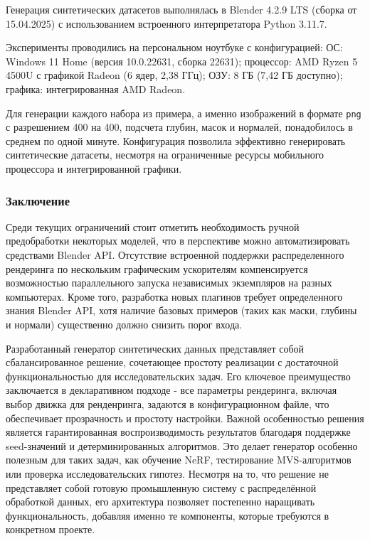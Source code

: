 Генерация синтетических датасетов выполнялась в Blender 4.2.9 LTS (сборка от
15.04.2025) с использованием встроенного интерпретатора Python 3.11.7.

Эксперименты проводились на персональном ноутбуке с конфигурацией: ОС: Windows
11 Home (версия 10.0.22631, сборка 22631); процессор: AMD Ryzen 5 4500U с
графикой Radeon (6 ядер, 2,38 ГГц); ОЗУ: 8 ГБ (7,42 ГБ доступно); графика:
интегрированная AMD Radeon.

Для генерации каждого набора из примера, а именно изображений в формате
\texttt{png} с разрешением 400 на 400, подсчета глубин, масок и нормалей,
понадобилось в среднем по одной минуте. Конфигурация позволила эффективно
генерировать синтетические датасеты, несмотря на ограниченные ресурсы мобильного
процессора и интегрированной графики.

\subsubsection*{Заключение}

Среди текущих ограничений стоит отметить необходимость ручной предобработки
некоторых моделей, что в перспективе можно автоматизировать средствами Blender
API. Отсутствие встроенной поддержки распределенного рендеринга по нескольким
графическим ускорителям компенсируется возможностью параллельного запуска
независимых экземпляров на разных компьютерах. Кроме того, разработка новых
плагинов требует определенного знания Blender API, хотя наличие базовых примеров
(таких как маски, глубины и нормали) существенно должно снизить порог входа.

Разработанный генератор синтетических данных представляет собой сбалансированное
решение, сочетающее простоту реализации с достаточной функциональностью для
исследовательских задач. Его ключевое преимущество заключается в декларативном
подходе - все параметры рендеринга, включая выбор движка для ренденринга,
задаются в конфигурационном файле, что обеспечивает прозрачность и простоту
настройки. Важной особенностью решения является гарантированная воспроизводимость
результатов благодаря поддержке seed-значений и детерминированных алгоритмов.
Это делает генератор особенно полезным для таких задач, как обучение NeRF,
тестирование MVS-алгоритмов или проверка исследовательских гипотез.
Несмотря на то, что решение не представляет собой готовую промышленную систему с
распределённой обработкой данных, его архитектура позволяет постепенно
наращивать функциональность, добавляя именно те компоненты, которые требуются в
конкретном проекте.
